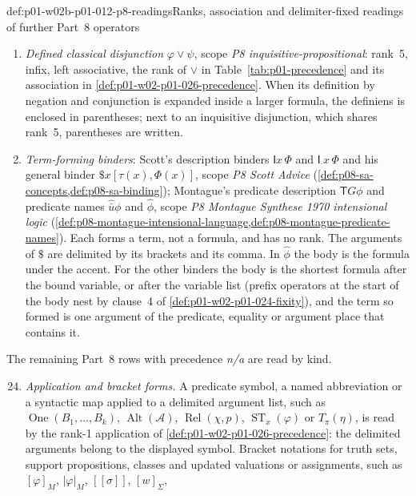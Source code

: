 \begin{hbconvention}{def:p01-w02b-p01-012-p8-readings}{Ranks, association and delimiter-fixed readings of further Part~8 operators}
\begin{enumerate}
  and clause~4 applies: the body is the shortest formula after the dot.
  A substitution \([\psi/p]\) written directly after a formula letter
  applies to that letter alone.
\item \emph{Defined classical disjunction} \(\varphi\lor\psi\), scope
  \emph{P8 inquisitive-propositional}: rank~5, infix, left associative,
  the rank of \(\lor\) in Table~\ref{tab:p01-precedence} and its
  association in \cref{def:p01-w02-p01-026-precedence}.
  When its definition by negation and conjunction is expanded inside a
  larger formula, the definiens is enclosed in parentheses; next to an
  inquisitive disjunction, which shares rank~5, parentheses are written.
\item \emph{Term-forming binders}: Scott's description binders
  \(\mathsf I x\,\Phi\) and \(\mathsf I_{\cdot}x\,\Phi\) and his general
  binder \(\$x[\tau(x),\Phi(x)]\), scope \emph{P8 Scott Advice}
  (\cref{def:p08-sa-concepts,def:p08-sa-binding}); Montague's predicate
  description \(\mathsf T G\phi\) and predicate names
  \(\widehat{\bar u}\phi\) and \(\widehat\phi\), scope
  \emph{P8 Montague Synthese 1970 intensional logic}
  (\cref{def:p08-montague-intensional-language,def:p08-montague-predicate-names}).
  Each forms a term, not a formula, and has no rank.  The arguments of
  \(\$\) are delimited by its brackets and its comma.  In \(\widehat\phi\)
  the body is the formula under the accent.  For the other binders the
  body is the shortest formula after the bound variable, or after the
  variable list (prefix operators at the start of the body nest by
  clause~4 of \cref{def:p01-w02-p01-024-fixity}), and the term so formed is one argument of the predicate, equality or argument place that
  contains it.
\end{enumerate}
The remaining Part~8 rows with precedence \emph{n/a} are read by kind.
\begin{enumerate}\setcounter{enumi}{23}
\item \emph{Application and bracket forms.}  A predicate symbol, a named
  abbreviation or a syntactic map applied to a delimited argument list,
  such as \(\operatorname{One}(B_1,\ldots,B_k)\),
  \(\operatorname{Alt}(\mathcal A)\), \(\operatorname{Rel}(\chi,p)\),
  \(\operatorname{ST}_x(\varphi)\) or \(T_\pi(\eta)\), is read by the
  rank-1 application of \cref{def:p01-w02-p01-026-precedence}: the
  delimited arguments belong to the displayed symbol.  Bracket notations
  for truth sets, support propositions, classes and updated valuations or assignments, such as
  \([\varphi]_M\), \(|\varphi|_M\), \([\![\sigma]\!]\), \([w]_\Sigma\),

\end{enumerate}
\end{hbconvention}
